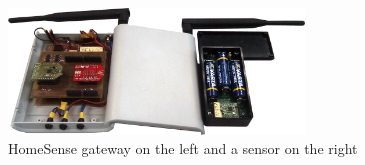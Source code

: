 \begin{figure}[H]\begin{center}
 \centering
  \captionsetup{justification=centering}
  \includegraphics[width=0.7\textwidth]{pictures/proposal/homesense}
  \caption{HomeSense gateway on the left and a sensor on the right\label{fig:Proposal-HomeSense}}
\end{center}\end{figure}



